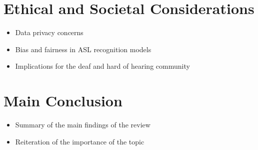 \section{Ethical and Societal Considerations}
\begin{itemize}
    \item Data privacy concerns
    \item Bias and fairness in ASL recognition models
    \item Implications for the deaf and hard of hearing community

\end{itemize}

\section{Main Conclusion}
\begin{itemize}
    \item Summary of the main findings of the review
    \item Reiteration of the importance of the topic
\end{itemize}